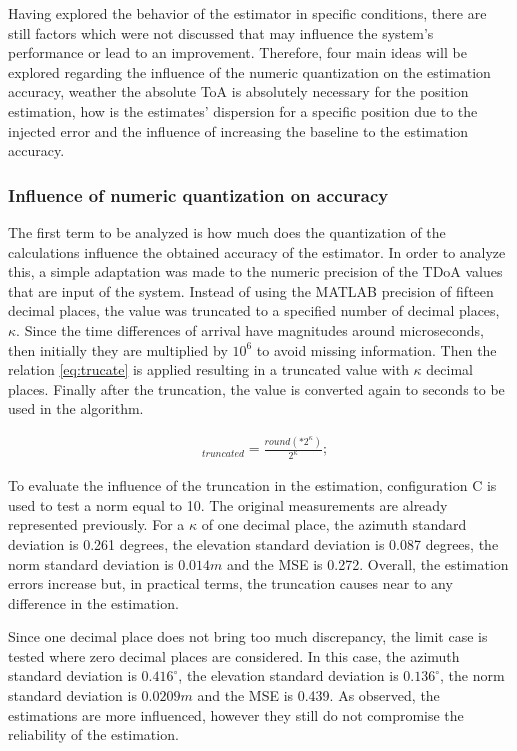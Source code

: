 Having explored the behavior of the estimator in specific conditions, there are still factors which were not discussed that may influence the system's performance or lead to an improvement. Therefore, four main ideas will be explored regarding the influence of the numeric quantization on the estimation accuracy, weather the absolute ToA is absolutely necessary for the position estimation, how is the estimates' dispersion for a specific position due to the injected error and the influence of increasing the baseline to the estimation accuracy.

\subsubsection{Influence of numeric quantization on accuracy}

The first term to be analyzed is how much does the quantization of the calculations influence the obtained accuracy of the estimator. In order to analyze this, a simple adaptation was made to the numeric precision of the TDoA values that are input of the system. Instead of using the MATLAB precision of fifteen decimal places, the value was truncated to a specified number of decimal places, $\kappa$.
Since the time differences of arrival have magnitudes around microseconds, then initially they are multiplied by $10^6$ to avoid missing information. Then the relation \ref{eq:trucate} is applied resulting in a truncated value with $\kappa$ decimal places. Finally after the truncation, the value is converted again to seconds to be used in the algorithm.

\begin{eqnarray}
&_{truncated} = \frac{round(*2^{\kappa})}{2^{\kappa}};
\label{eq:trucate}
\end{eqnarray}

To evaluate the influence of the truncation in the estimation, configuration C is used to test a norm equal to 10. The original measurements are already represented previously. For a $\kappa$ of one decimal place, the azimuth standard deviation is 0.261 degrees, the elevation standard deviation is 0.087 degrees, the norm standard deviation is $0.014m$ and the MSE is 0.272. Overall, the estimation errors increase but, in practical terms, the truncation causes near to any difference in the estimation. 

Since one decimal place does not bring too much discrepancy, the limit case is tested where zero decimal places are considered. In this case, the azimuth standard deviation is $0.416^{\circ}$, the elevation standard deviation is $0.136^{\circ}$, the norm standard deviation is $0.0209m$ and the MSE is 0.439. As observed, the estimations are more influenced, however they still do not compromise the reliability of the estimation.

